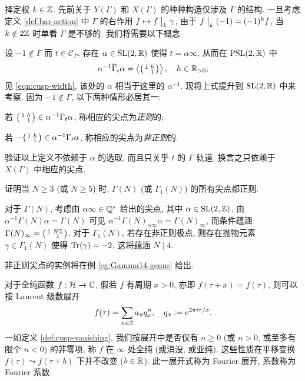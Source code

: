 择定权 $k \in \mathbb{Z}$. 先前关于 $Y(\Gamma)$ 和 $X(\Gamma)$ 的种种构造仅涉及 $\overline{\Gamma}$ 的结构. 一旦考虑定义 \ref{def:bar-action} 中 $\Gamma$ 的右作用 $f \mapsto f \;\big|_{k} \; \gamma$, 由于 $f \;\big|_{k} \; (-1) = (-1)^k f$, 当 $k \notin 2\mathbb{Z}$ 时单看 $\overline{\Gamma}$ 是不够的. 我们将需要以下概念.

\begin{definition}[正则尖点]\label{def:regular-cusp} 
	设 $-1 \notin \Gamma$ 而 $t \in \mathcal{C}_\Gamma$. 存在 $\alpha \in \operatorname{SL}(2, \mathbb{R})$ 使得 $t = \alpha\infty$, 从而在 $\operatorname{PSL}(2,\mathbb{R})$ 中
	\[ \alpha^{-1} \overline{\Gamma}_t \alpha = \left\langle \bigl(\begin{smallmatrix} 1 & h \\  & 1 \end{smallmatrix}\bigr) \right\rangle, \quad h \in \mathbb{R}_{>0}; \]
	见 \eqref{eqn:cusp-width}, 该处的 $\alpha$ 相当于这里的 $\alpha^{-1}$. 现将上式提升到 $\operatorname{SL}(2,\mathbb{R})$ 中来考察. 因为 $-1 \notin \Gamma$, 以下两种情形必居其一:
	\begin{compactitem}
		\item 若 $\bigl(\begin{smallmatrix} 1 & h \\  & 1 \end{smallmatrix}\bigr) \in \alpha^{-1} \Gamma_t \alpha$, 称相应的尖点为\emph{正则}的;
		\item 若 $-\bigl(\begin{smallmatrix} 1 & h \\  & 1 \end{smallmatrix}\bigr) \in \alpha^{-1} \Gamma_t \alpha$, 称相应的尖点为\emph{非正则}的.
	\end{compactitem}
\end{definition}

\begin{exercise}
	验证以上定义不依赖于 $\alpha$ 的选取, 而且只关乎 $t$ 的 $\Gamma$ 轨道, 换言之只依赖于 $X(\Gamma)$ 中相应的尖点.
\end{exercise}

\begin{exercise}\label{exo:regular-cusp}
	证明当 $N \geq 3$ (或 $N \geq 5$) 时, $\Gamma(N)$ (或 $\Gamma_1(N)$) 的所有尖点都正则.
	
	\begin{hint}
		对于 $\Gamma(N)$, 考虑由 $\alpha \infty \in \mathbb{Q}^*$ 给出的尖点, 其中 $\alpha \in \operatorname{SL}(2,\mathbb{Z})$. 由 $\alpha^{-1} \Gamma(N) \alpha = \Gamma(N)$ 可见 $\alpha^{-1} \Gamma(N)_{\alpha\infty} \alpha = \Gamma(N)_\infty$, 而条件蕴涵 $\Gamma(N)_\infty = \bigl(\begin{smallmatrix} 1 & N\mathbb{Z} \\  & 1 \end{smallmatrix}\bigr)$. 对于 $\Gamma_1(N)$, 若存在非正则极点, 则存在抛物元素 $\gamma \in \Gamma_1(N)$ 使得 $\operatorname{Tr}(\gamma) = -2$, 这将蕴涵 $N \mid 4$.
	\end{hint}
\end{exercise}

非正则尖点的实例将在例 \ref{eg:Gamma14-genus} 给出.

对于全纯函数 $f: \mathcal{H} \to \mathbb{C}$, 假若 $f$ 有周期 $x > 0$, 亦即 $f(\tau + x) = f(\tau)$, 则可以按 Laurent 级数展开
\[ f(\tau) = \sum_{n \in \mathbb{Z}} a_n q_x^n, \quad q_x := e^{2\pi i\tau/x}. \]
一如定义 \ref{def:cusp-vanishing}, 我们按展开中是否仅有 $n \geq 0$ (或 $n > 0$, 或至多有限个 $n < 0$) 的非零项, 称 $f$ 在 $\infty$ 处全纯 (或消没, 或亚纯). 这些性质在平移变换 $f(\tau) \leadsto f(\tau + b)$ 下并不改变 ($b \in \mathbb{R}$). 此一展开式称为 Fourier 展开, 系数称为 Fourier 系数. 

